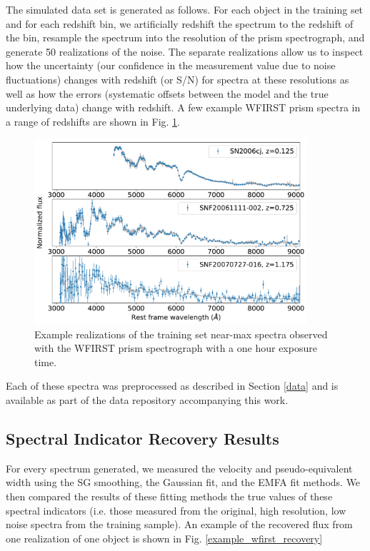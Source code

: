 The simulated data set is generated as follows. For each object in the training set and for each redshift bin, we artificially redshift the spectrum to the redshift of the bin, resample the spectrum into the resolution of the prism spectrograph, and generate 50 realizations of the noise. The separate realizations allow us to inspect how the uncertainty (our confidence in the measurement value due to noise fluctuations) changes with redshift (or S/N) for spectra at these resolutions as well as how the errors (systematic offsets between the model and the true underlying data) change with redshift. A few example WFIRST prism spectra in a range of redshifts are shown in Fig. \ref{wfirst_example_spectra}.

\begin{figure}[htbp]
    \centering
    \includegraphics[width=0.9\textwidth]{figures/si_feat_pca/wfirst_example_spectra.pdf}
    \caption{Example realizations of the training set near-max spectra observed with the WFIRST prism spectrograph with a one hour exposure time.}
    \label{wfirst_example_spectra}
\end{figure}

Each of these spectra was preprocessed as described in Section \ref{data} and is available as part of the data repository accompanying this work.

\subsection{Spectral Indicator Recovery Results}
For every spectrum generated, we measured the velocity and pseudo-equivalent width using the SG smoothing, the Gaussian fit, and the EMFA fit methods. We then compared the results of these fitting methods the true values of these spectral indicators (i.e. those measured from the original, high resolution, low noise spectra from the training sample). An example of the recovered flux from one realization of one object is shown in Fig. \ref{example_wfirst_recovery}

